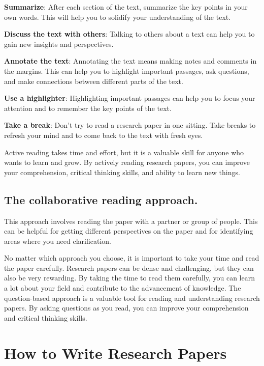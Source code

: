 \documentclass[
]{book}
\begin{document}
\textbf{Summarize}: After each section of the text, summarize the key points in your own words. This will help you to solidify your understanding of the text.

\textbf{Discuss the text with others}: Talking to others about a text can help you to gain new insights and perspectives.

\textbf{Annotate the text}: Annotating the text means making notes and comments in the margins. This can help you to highlight important passages, ask questions, and make connections between different parts of the text.

\textbf{Use a highlighter}: Highlighting important passages can help you to focus your attention and to remember the key points of the text.

\textbf{Take a break}: Don't try to read a research paper in one sitting. Take breaks to refresh your mind and to come back to the text with fresh eyes.

Active reading takes time and effort, but it is a valuable skill for anyone who wants to learn and grow. By actively reading research papers, you can improve your comprehension, critical thinking skills, and ability to learn new things.

\subsection*{The collaborative reading approach.}\label{the-collaborative-reading-approach.}

This approach involves reading the paper with a partner or group of people. This can be helpful for getting different perspectives on the paper and for identifying areas where you need clarification.

No matter which approach you choose, it is important to take your time and read the paper carefully. Research papers can be dense and challenging, but they can also be very rewarding. By taking the time to read them carefully, you can learn a lot about your field and contribute to the advancement of knowledge. The question-based approach is a valuable tool for reading and understanding research papers. By asking questions as you read, you can improve your comprehension and critical thinking skills.

\section{How to Write Research Papers}\label{write}
\end{document}
